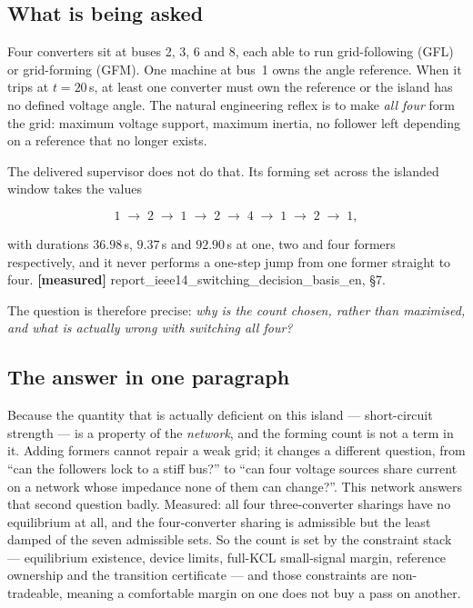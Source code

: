\documentclass[12pt,a4paper]{article}
\theoremstyle{remark}
\newcommand{\code}[1]{{\ttfamily\small\hyphenchar\font=-1 #1}}
\newcommand{\measured}{\textcolor{ok}{\textbf{[measured]}}}
\begin{document}
\subsection{What is being asked}

Four converters sit at buses 2, 3, 6 and 8, each able to run grid-following
(GFL) or grid-forming (GFM). One machine at bus~1 owns the angle reference. When
it trips at $t=20$\,s, at least one converter must own the reference or the
island has no defined voltage angle. The natural engineering reflex is to make
\emph{all four} form the grid: maximum voltage support, maximum inertia, no
follower left depending on a reference that no longer exists.

The delivered supervisor does not do that. Its forming set across the islanded
window takes the values

\begin{equation}
1 \;\to\; 2 \;\to\; 1 \;\to\; 2 \;\to\; 4 \;\to\; 1 \;\to\; 2 \;\to\; 1,
\label{eq:countseq}
\end{equation}

with durations $36.98$\,s, $9.37$\,s and $92.90$\,s at one, two and four
formers respectively, and it never performs a one-step jump from one former
straight to four. \measured{} \code{report\_ieee14\_switching\_decision\_basis\_en}, \S7.

The question is therefore precise: \emph{why is the count chosen, rather than
maximised, and what is actually wrong with switching all four?}

\subsection{The answer in one paragraph}

Because the quantity that is actually deficient on this island --- short-circuit
strength --- is a property of the \emph{network}, and the forming count is not a
term in it. Adding formers cannot repair a weak grid; it changes a different
question, from ``can the followers lock to a stiff bus?'' to ``can four voltage
sources share current on a network whose impedance none of them can change?''.
This network answers that second question badly. Measured: all four
three-converter sharings have no equilibrium at all, and the four-converter
sharing is admissible but the least damped of the seven admissible sets. So the
count is set by the constraint stack --- equilibrium existence, device limits,
full-KCL small-signal margin, reference ownership and the transition
certificate --- and those constraints are non-tradeable, meaning a comfortable
margin on one does not buy a pass on another.
\end{document}
